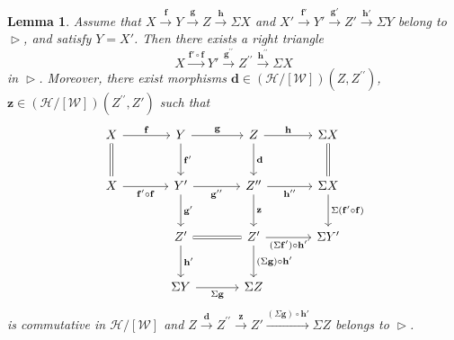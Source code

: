 \documentclass[a4paper,reqno,10pt]{amsart}
\DeclareRobustCommand{\darkblueedit}[1]{#1}
\newtheorem{lemma}[lemma]{Lemma}
\theoremstyle{definition}
\theoremstyle{definition}
\theoremstyle{definition}
\theoremstyle{definition}
\theoremstyle{plain}
\newcommand{\CH}{\mathcal{H}}
\newcommand{\CW}{\mathcal{W}}
\begin{document}
\begin{lemma}\label{lem:RTR4}
Assume that $X\xrightarrow{\mathbf{f}}Y\xrightarrow{\mathbf{g}}Z\xrightarrow{\mathbf{h}}\Sigma X$ and 
$X'\xrightarrow{\mathbf{f}'}Y'\xrightarrow{\mathbf{g}'}Z'\xrightarrow{\mathbf{h}'}\Sigma Y$
belong to $\vartriangleright$, and satisfy $Y=X'$.
Then \darkblueedit{there exists a right triangle}
\color{blue}
\[
X\xrightarrow{\mathbf{f'}\circ\mathbf{f}}Y'\xrightarrow{\mathbf{g^{\prime\prime}}}Z^{\prime\prime}\xrightarrow{\mathbf{h}^{\prime\prime}}\Sigma X
\]
\normalcolor
\darkblueedit{in $\vartriangleright$. Moreover, there exist morphisms} $\mathbf{d}\in(\CH/[\CW])(Z,Z^{\prime\prime})$, $\mathbf{z}\in(\CH/[\CW])(Z^{\prime\prime}, Z')$
such that
\[
\begin{tikzcd}[row sep=0.9cm, column sep=1.2cm]
{}
X
\arrow{r}{\mathbf{f}}
\arrow[equal]{d}{}
&Y
\arrow{r}{\mathbf{g}}
\arrow{d}{\mathbf{f}'} 
&
Z
\arrow{r}{\mathbf{h}}
\arrow{d}{\mathbf{d}}
&
\Sigma X \arrow[equal]{d}{}
\\
X
\arrow{r}[swap]{\mathbf{f}'\circ\mathbf{f}}
&
Y' 
\arrow{r}[swap]{\mathbf{g}^{\prime\prime}}
\arrow{d}{\mathbf{g}'} 
&Z^{\prime\prime}
\arrow{r}[swap]{\mathbf{h}^{\prime\prime}}
\arrow{d}{\mathbf{z}}
&\Sigma X
\arrow{d}{\Sigma(\mathbf{f}'\circ\mathbf{f})}
\\
&Z'
\arrow[equal]{r}
\arrow{d}{\mathbf{h}'}
&Z'
\arrow{r}[swap]{(\Sigma\mathbf{f}')\circ\mathbf{h}'}
\arrow{d}{(\Sigma\mathbf{g})\circ\mathbf{h}'}
&\Sigma Y'
\\
&\Sigma Y
\arrow[swap]{r}{\Sigma\mathbf{g}}
&\Sigma Z
\end{tikzcd}
\]
is commutative in $\CH/[\CW]$ and 
$Z\xrightarrow{\mathbf{d}}Z^{\prime\prime}\xrightarrow{\mathbf{z}}Z'\xrightarrow{(\Sigma\mathbf{g})\circ\mathbf{h}'}\Sigma Z$
belongs to $\vartriangleright$.
\end{lemma}
\end{document}
